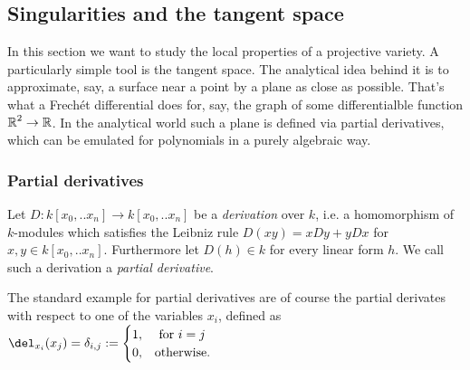 \subsection{Singularities and the tangent space}

In this section we want to study the local properties of a projective variety.
A particularly simple tool is the tangent space.
The analytical idea behind it is to approximate, say, a surface near a point by a plane as close as possible.
That's what a Frechét differential does for, say,  the graph of some differentialble function $\operatorname{\mathbb R}^2 \to \operatorname{\mathbb R}$.
In the analytical world such a plane is defined via partial derivatives, which can be emulated for polynomials in a purely algebraic way.

\subsubsection{Partial derivatives}
\begin{definition}
Let $D : k[x_0,..x_n] \to k[x_0,..x_n]$ be a \emph{derivation} over $k$, i.e. a homomorphism of $k$-modules which satisfies the Leibniz rule $D(xy) = xDy+yDx$ for $x,y \in k[x_0,..x_n]$. Furthermore let $D(h) \in k$ for every linear form $h$. We call such a derivation a \emph{partial derivative}.
\end{definition}

\begin{example}
The standard example for partial derivatives are of course the partial derivates with respect to one of the variables $x_i$, defined as $\del_{x_i}(x_j) = \delta_{i,j} := \begin{cases} 1, & \text{ for } i = j \\ 0, & \text {otherwise.} \end{cases}$
\end{example}

